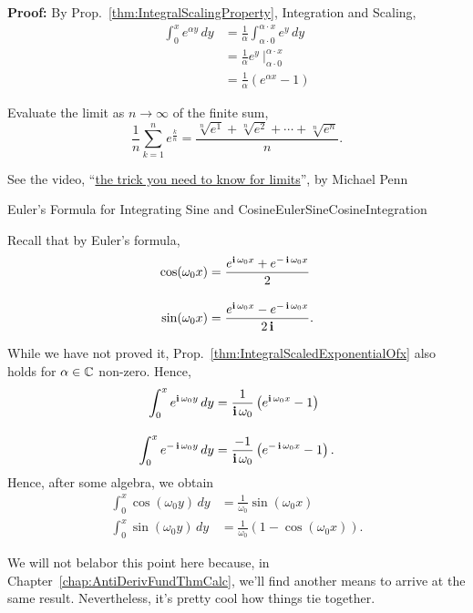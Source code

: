 \textbf{Proof:} By Prop.~\ref{thm:IntegralScalingProperty}, Integration and Scaling, 
\begin{align*}
    \int_0^x e^{\alpha y}\, dy &= \frac{1}{\alpha} \int_{\alpha \cdot 0}^{\alpha\cdot x} e^{y} \, dy \\[1em]
    &= \frac{1}{\alpha}  e^y~ \Big|_{\alpha \cdot 0}^{\alpha\cdot x} \\[1em]
    &= \frac{1}{\alpha} \left(e^{\alpha x} -1 \right)
\end{align*}

\Qed

\bigskip

\begin{example} Evaluate the limit as $n\to \infty$ of the finite sum,
$$ \frac{1}{n} \sum_{k=1}^n e^{\frac{k}{n}} = \frac{\sqrt[n]{e^1} + \sqrt[n]{e^2} + \cdots + \sqrt[n]{e^n}}{n}. $$
    
\end{example}

\solution See the video, ``\href{https://www.youtube.com/shorts/d4xpB32bc5Y?feature=share}{the trick you need to know for limits}'', by Michael Penn

\Qed

\begin{factColor}{Euler's Formula for Integrating Sine and Cosine}{EulerSineCosineIntegration} 

Recall that by Euler's formula, 
\begin{equation}
    \begin{aligned}
        \cos(\omega_0 x) &= \frac{e^{\mathop{\bm{\mathrm i}} \omega_0 x}+ e^{-\mathop{\bm{\mathrm i}} \omega_0 x}}{2} \\[1em]
        \sin(\omega_0 x) &= \frac{e^{\mathop{\bm{\mathrm i}} \omega_0 x}- e^{-\mathop{\bm{\mathrm i}} \omega_0 x}}{2 \mathop{\bm{\mathrm i}}}.
    \end{aligned}
\end{equation}

While we have not proved it, Prop.~\ref{thm:IntegralScaledExponentialOfx} also holds for $\alpha \in \mathbb C$ non-zero. Hence,
\begin{equation}
    \begin{aligned}
        \int_0^x e^{\mathop{\bm{\mathrm i}} \omega_0 y} \, dy &= \frac{1}{\mathop{\bm{\mathrm i}} \omega_0} \left( e^{\mathop{\bm{\mathrm i}} \omega_0 x} -1 \right) \\[1em]
        \int_0^x e^{-\mathop{\bm{\mathrm i}} \omega_0 y} \, dy& = \frac{-1}{\mathop{\bm{\mathrm i}} \omega_0} \left(e^{-\mathop{\bm{\mathrm i}} \omega_0 x} -1 \right).
    \end{aligned}
\end{equation}
Hence, after some algebra, we obtain
\begin{equation}
    \begin{aligned}
       \int_0^x \cos(\omega_0 y) \, dy&= \frac{1}{\omega_0}  \sin(\omega_0 x) \\[1em]
       \int_0^x  \sin(\omega_0 y)\, dy &= \frac{1}{\omega_0} \left(1 - \cos(\omega_0 x)  \right).
    \end{aligned}
\end{equation}

We will not belabor this point here because, in Chapter~\ref{chap:AntiDerivFundThmCalc}, we'll find another means to arrive at the same result. Nevertheless, it's pretty cool how things tie together.    
\end{factColor}

